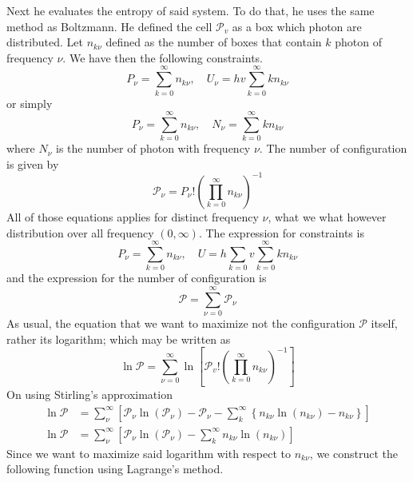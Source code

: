 \documentclass[../../../Main.tex]{subfiles}
\begin{document}
Next he evaluates the entropy of said system. To do that, he uses the same method as Boltzmann. He defined the cell $\mathcal{P}_v$ as a box which photon are distributed. Let $n_{k\nu}$ defined as the number of boxes that contain $k$ photon of frequency $\nu$. We have then the following constraints.
\begin{equation*}
    P_\nu=\sum_{k=0}^{\infty}n_{k\nu},\quad U_\nu= hv\sum_{k=0}^{\infty}kn_{k\nu}
\end{equation*}
or simply
\begin{equation*}
    P_\nu=\sum_{k=0}^{\infty}n_{k\nu},\quad N_\nu= \sum_{k=0}^{\infty} kn_{k\nu}
\end{equation*}
where $N_\nu$ is the number of photon with frequency $\nu$. The number of configuration is given by 
\begin{equation*}
    \mathcal{P}_\nu=P_\nu!\left(\prod_{k=0}^{\infty}n_{k\nu}\right)^{-1}
\end{equation*}  
All of those equations applies for distinct frequency $\nu$, what we what however distribution over all frequency $(0,\infty)$. The expression for constraints is
\begin{equation*}
    P_\nu=\sum_{k=0}^{\infty}n_{k\nu},\quad U= h\sum_{k=0}v\sum_{k=0}^{\infty}kn_{k\nu}
\end{equation*}
and the expression for the number of configuration is 
\begin{equation*}
    \mathcal{P}=\sum_{\nu=0}^{\infty}\mathcal{P}_\nu
\end{equation*} 
As usual, the equation that we want to maximize not the configuration $\mathcal{P}$ itself, rather its logarithm; which may be written as 
\begin{equation*}
    \ln \mathcal{P}=\sum_{\nu=0}^{\infty}\ln\left[\mathcal{P}_v!\left( \prod_{k=0}^{\infty} n_{k\nu}\right)^{-1}\right]
\end{equation*}
On using Stirling's approximation
\begin{align*}
    \ln \mathcal{P}&=\sum_\nu^\infty\left[\mathcal{P}_\nu\ln \left(\mathcal{P}_\nu\right)-\mathcal{P}_\nu - \sum_{k}^{\infty}\left\{n_{k\nu}\ln \left(n_{k\nu} \right)-n_{k\nu} \right\}\right]\\
    \ln \mathcal{P}&=\sum_\nu^\infty\left[\mathcal{P}_\nu\ln \left(\mathcal{P}_\nu\right) - \sum_{k}^{\infty}n_{k\nu}\ln \left(n_{k\nu} \right)\right]
\end{align*}
Since we want to maximize said logarithm with respect to $n_{k\nu}$, we construct the following function using Lagrange's method.
\end{document}
